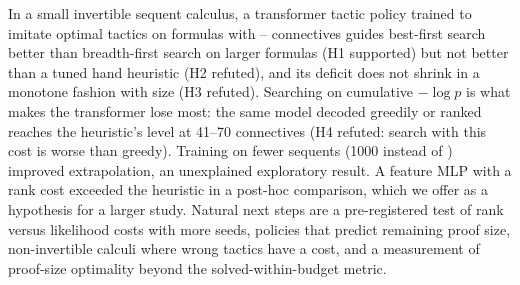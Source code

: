 In a small invertible sequent calculus, a transformer tactic policy trained to imitate optimal tactics on formulas with -- connectives guides best-first search better than breadth-first search on larger formulas (H1 supported) but not better than a tuned hand heuristic (H2 refuted), and its deficit does not shrink in a monotone fashion with size (H3 refuted). Searching on cumulative $-\log p$ is what makes the transformer lose most: the same model decoded greedily or ranked reaches the heuristic's level at 41--70 connectives (H4 refuted: search with this cost is worse than greedy). Training on fewer sequents (1000 instead of ) improved extrapolation, an unexplained exploratory result. A feature MLP with a rank cost exceeded the heuristic in a post-hoc comparison, which we offer as a hypothesis for a larger study. Natural next steps are a pre-registered test of rank versus likelihood costs with more seeds, policies that predict remaining proof size, non-invertible calculi where wrong tactics have a cost, and a measurement of proof-size optimality beyond the solved-within-budget metric.

